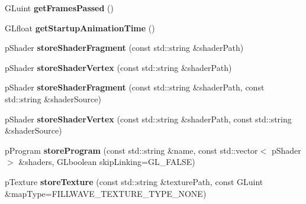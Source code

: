 \begin{DoxyCompactItemize}
\item 
\hypertarget{classfillwave_1_1Engine_a019edbfa9aa9dcae5775e909df489248}{}G\+Luint {\bfseries get\+Frames\+Passed} ()\label{classfillwave_1_1Engine_a019edbfa9aa9dcae5775e909df489248}

\item 
\hypertarget{classfillwave_1_1Engine_ad8c86cffe83dcb264741a21269b9f5f0}{}G\+Lfloat {\bfseries get\+Startup\+Animation\+Time} ()\label{classfillwave_1_1Engine_ad8c86cffe83dcb264741a21269b9f5f0}

\item 
\hypertarget{classfillwave_1_1Engine_a5ba05b3ad8f87b5a91dffe0abfefc586}{}p\+Shader {\bfseries store\+Shader\+Fragment} (const std\+::string \&shader\+Path)\label{classfillwave_1_1Engine_a5ba05b3ad8f87b5a91dffe0abfefc586}

\item 
\hypertarget{classfillwave_1_1Engine_a993e9b3f716bb832d017df28b76e949c}{}p\+Shader {\bfseries store\+Shader\+Vertex} (const std\+::string \&shader\+Path)\label{classfillwave_1_1Engine_a993e9b3f716bb832d017df28b76e949c}

\item 
\hypertarget{classfillwave_1_1Engine_a198587bb1ba07669dc9662f2a77ef23a}{}p\+Shader {\bfseries store\+Shader\+Fragment} (const std\+::string \&shader\+Path, const std\+::string \&shader\+Source)\label{classfillwave_1_1Engine_a198587bb1ba07669dc9662f2a77ef23a}

\item 
\hypertarget{classfillwave_1_1Engine_a63be33b71b6541023cc986e12a20835a}{}p\+Shader {\bfseries store\+Shader\+Vertex} (const std\+::string \&shader\+Path, const std\+::string \&shader\+Source)\label{classfillwave_1_1Engine_a63be33b71b6541023cc986e12a20835a}

\item 
\hypertarget{classfillwave_1_1Engine_ad8cbc06ff1f9bba8e3cef59a3c876126}{}p\+Program {\bfseries store\+Program} (const std\+::string \&name, const std\+::vector$<$ p\+Shader $>$ \&shaders, G\+Lboolean skip\+Linking=G\+L\+\_\+\+F\+A\+L\+S\+E)\label{classfillwave_1_1Engine_ad8cbc06ff1f9bba8e3cef59a3c876126}

\item 
\hypertarget{classfillwave_1_1Engine_a6523d9365737f629897b1762eae50018}{}p\+Texture {\bfseries store\+Texture} (const std\+::string \&texture\+Path, const G\+Luint \&map\+Type=F\+I\+L\+L\+W\+A\+V\+E\+\_\+\+T\+E\+X\+T\+U\+R\+E\+\_\+\+T\+Y\+P\+E\+\_\+\+N\+O\+N\+E)\label{classfillwave_1_1Engine_a6523d9365737f629897b1762eae50018}


\end{DoxyCompactItemize}
